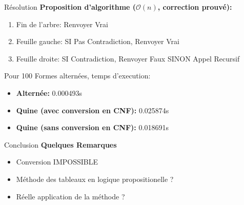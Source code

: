 \documentclass{beamer}
\begin{document}
\begin{frame}[fragile]{Résolution}
    \textbf{Proposition d'algorithme ($\mathcal{O}(n)$, correction prouvé):}
    \begin{enumerate}
        \item Fin de l'arbre: Renvoyer Vrai
        \item Feuille gauche: SI Pas Contradiction, Renvoyer Vrai
        \item Feuille droite: SI Contradiction, Renvoyer Faux SINON Appel Recursif
        
    \end{enumerate}
    \pause

    \vspace{10px}
    Pour 100 Formes alternées, temps d'execution:
    \begin{itemize}
        \item \textbf{Alternée:} 0.000493s
        \item \textbf{Quine (avec conversion en CNF):} 0.025874s
        \item \textbf{Quine (sans conversion en CNF):} 0.018691s
    \end{itemize} 

\end{frame}
 
\begin{frame}{Conclusion}
    \textbf{Quelques Remarques}
    \begin{itemize}[<+->]
        \item Conversion IMPOSSIBLE
        \item Méthode des tableaux en logique propositionelle ?
        \item Réelle application de la méthode ?
    \end{itemize}
\end{frame}
\end{document}
